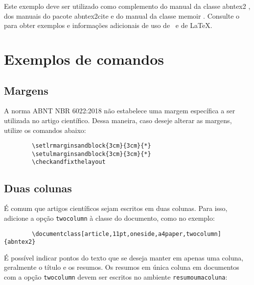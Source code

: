 \documentclass[
article,			%
11pt,				%
oneside,			%
a4paper,			%
english,			%
brazil,				%
sumario=tradicional
]{abntex2}
\begin{document}
	Este exemplo deve ser utilizado como complemento do manual da classe
	\textsf{abntex2} \cite{abntex2classe}, dos manuais do pacote
	\textsf{abntex2cite} \cite{abntex2cite,abntex2cite-alf} e do manual da classe
	\textsf{memoir} \cite{memoir}. Consulte o  para obter
	exemplos e informações adicionais de uso de \abnTeX\ e de \LaTeX.
	
	\section{Exemplos de comandos}
	
	\subsection{Margens}
	
	A norma ABNT NBR 6022:2018 não estabelece uma margem específica a ser utilizada
	no artigo científico. Dessa maneira, caso deseje alterar as margens, utilize os
	comandos abaixo:
	
	\begin{verbatim}
		\setlrmarginsandblock{3cm}{3cm}{*}
		\setulmarginsandblock{3cm}{3cm}{*}
		\checkandfixthelayout
	\end{verbatim}
	
	\subsection{Duas colunas}
	
	É comum que artigos científicos sejam escritos em duas colunas. Para isso,
	adicione a opção \texttt{twocolumn} à classe do documento, como no exemplo:
	
	\begin{verbatim}
		\documentclass[article,11pt,oneside,a4paper,twocolumn]{abntex2}
	\end{verbatim}
	
	É possível indicar pontos do texto que se deseja manter em apenas uma coluna,
	geralmente o título e os resumos. Os resumos em única coluna em documentos com
	a opção \texttt{twocolumn} devem ser escritos no ambiente
	\texttt{resumoumacoluna}:
	
\end{document}
